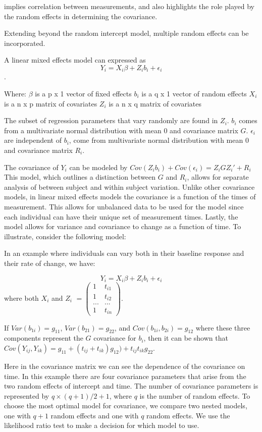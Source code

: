 \documentclass[12pt, twoside]{amherstthesis}
\theoremstyle{definition}
\theoremstyle{definition}
\theoremstyle{definition}
\theoremstyle{remark}
\begin{document}
implies correlation between measurements, and also highlights the role played by the random effects in determining the covariance.

Extending beyond the random intercept model, multiple random effects can be incorporated.

A linear mixed effects model can expressed as \[Y_i = X_i\beta+Z_ib_i+\epsilon_i\].

Where:
\(\beta\) is a p x 1 vector of fixed effects
\(b_i\) is a q x 1 vector of random effects
\(X_i\) is a n x p matrix of covariates
\(Z_i\) is a n x q matrix of covariates

The subset of regression parameters that vary randomly are found in \(Z_i\). \(b_i\) comes from a multivariate normal distribution with mean 0 and covariance matrix \(G\). \(\epsilon_i\) are independent of \(b_i\), come from multivariate normal distribution with mean 0 and covariance matrix \(R_i\).

The covariance of \(Y_i\) can be modeled by \(Cov(Z_ib_i) + Cov(\epsilon_i) = Z_iGZ_i' + R_i\) This model, which outlines a distinction between \(G\) and \(R_i\), allows for separate analysis of between subject and within subject variation. Unlike other covariance models, in linear mixed effects models the covariance is a function of the times of measurement. This allows for unbalanced data to be used for the model since each individual can have their unique set of measurement times. Lastly, the model allows for variance and covariance to change as a function of time. To illustrate, consider the following model:

In an example where individuals can vary both in their baseline response and their rate of change, we have:

\[Y_i = X_i\beta+Z_ib_i+\epsilon_i\] where both \(X_i\) and \(Z_i\) \(= \begin{pmatrix} 1 & t_{i1} \\ 1 & t_{i2} \\ ... & ... \\ 1 & t_{in}\end{pmatrix}\).

If \(Var(b_{1i}) = g_{11}\), \(Var(b_{21}) = g_{22}\), and \(Cov(b_{1i},b_{2i}) = g_{12}\) where these three components represent the \(G\) covariance for \(b_i\), then
it can be shown that \(Cov(Y_{ij}, Y_{ik}) = g_{11} + (t_{ij} + t_{ik})g_{12}) + t_{ij}t_{ik}g_{22}\).

Here in the covariance matrix we can see the dependence of the covariance on time. In this example there are four covariance parameters that arise from the two random effects of intercept and time. The number of covariance parameters is represented by \(q \times (q+1)/2 + 1\), where \(q\) is the number of random effects. To choose the most optimal model for covariance, we compare two nested models, one with \(q+1\) random effects and one with \(q\) random effects. We use the likelihood ratio test to make a decision for which model to use.
\end{document}
